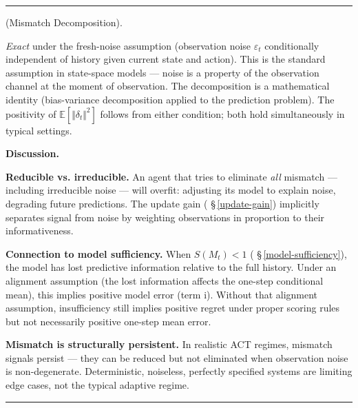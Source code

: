 \documentclass[11pt,oneside]{article}
\newcounter{claim}[section]
\renewcommand{\theclaim}{\thesection.\arabic{claim}}
\newenvironment{segment}[2]{%
  \refstepcounter{claim}%
  \bigskip\noindent\hrule\smallskip
  \noindent{\bfseries #1~\theclaim}\enskip(#2).\par\smallskip
  \noindent\ignorespaces
}{%
  \par\smallskip\noindent\hrule\bigskip
}
\newenvironment{theorem}[1][]{\begin{segment}{Theorem}{#1}}{\end{segment}}
\begin{document}
\begin{theorem}[Mismatch Decomposition]
\textit{Exact} under the fresh-noise assumption (observation noise $\varepsilon_t$ conditionally independent of history given current state and action). This is the standard assumption in state-space models — noise is a property of the observation channel at the moment of observation. The decomposition is a mathematical identity (bias-variance decomposition applied to the prediction problem). The positivity of $\mathbb{E}[\Vert\delta_t\Vert^2]$ follows from either condition; both hold simultaneously in typical settings.


\medskip\noindent\textbf{Discussion.}


\textbf{Reducible vs. irreducible.} An agent that tries to eliminate \textit{all} mismatch — including irreducible noise — will overfit: adjusting its model to explain noise, degrading future predictions. The update gain ( \S\,\ref{update-gain}) implicitly separates signal from noise by weighting observations in proportion to their informativeness.

\textbf{Connection to model sufficiency.} When $S(M_t) < 1$ ( \S\,\ref{model-sufficiency}), the model has lost predictive information relative to the full history. Under an alignment assumption (the lost information affects the one-step conditional mean), this implies positive model error (term i). Without that alignment assumption, insufficiency still implies positive regret under proper scoring rules but not necessarily positive one-step mean error.

\textbf{Mismatch is structurally persistent.} In realistic ACT regimes, mismatch signals persist — they can be reduced but not eliminated when observation noise is non-degenerate. Deterministic, noiseless, perfectly specified systems are limiting edge cases, not the typical adaptive regime.

\end{theorem}
\end{document}
